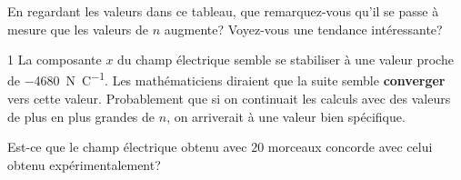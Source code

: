\documentclass{tufte-handout}
\def\reponse{1}
\begin{document}

En regardant les valeurs dans ce tableau, que remarquez-vous qu'il se passe à
mesure que les valeurs de $n$ augmente? Voyez-vous une tendance intéressante?

\if\reponse1
  {\color{tblue}
    La composante $x$ du champ électrique semble se stabiliser à une valeur
    proche de \SI{-4680}{\newton\per\coulomb}. Les mathématiciens diraient que
    la suite semble \textbf{converger} vers cette valeur. Probablement que si
    on continuait les calculs avec des valeurs de plus en plus grandes de $n$,
    on arriverait à une valeur bien spécifique.
  }
\else
  \vspace{1cm}
\fi

Est-ce que le champ électrique obtenu avec $20$ morceaux concorde avec celui
obtenu expérimentalement?
\end{document}
